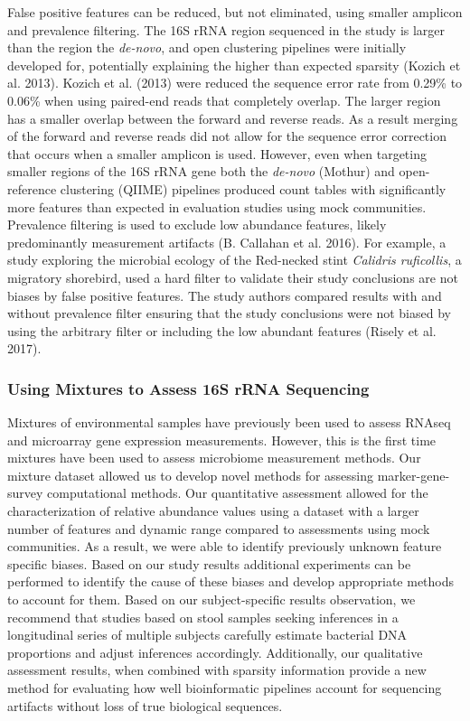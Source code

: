 \documentclass[smallextended]{svjour3}       %
\begin{document}
False positive features can be reduced, but not eliminated, using
smaller amplicon and prevalence filtering. The 16S rRNA region sequenced
in the study is larger than the region the \emph{de-novo}, and open
clustering pipelines were initially developed for, potentially
explaining the higher than expected sparsity (Kozich et al. 2013).
Kozich et al. (2013) were reduced the sequence error rate from 0.29\% to
0.06\% when using paired-end reads that completely overlap. The larger
region has a smaller overlap between the forward and reverse reads. As a
result merging of the forward and reverse reads did not allow for the
sequence error correction that occurs when a smaller amplicon is used.
However, even when targeting smaller regions of the 16S rRNA gene both
the \emph{de-novo} (Mothur) and open-reference clustering (QIIME)
pipelines produced count tables with significantly more features than
expected in evaluation studies using mock communities. Prevalence
filtering is used to exclude low abundance features, likely
predominantly measurement artifacts (B. Callahan et al. 2016). For
example, a study exploring the microbial ecology of the Red-necked stint
\emph{Calidris ruficollis}, a migratory shorebird, used a hard filter to
validate their study conclusions are not biases by false positive
features. The study authors compared results with and without prevalence
filter ensuring that the study conclusions were not biased by using the
arbitrary filter or including the low abundant features (Risely et al.
2017).

\hypertarget{using-mixtures-to-assess-16s-rrna-sequencing}{%
\subsubsection{Using Mixtures to Assess 16S rRNA
Sequencing}\label{using-mixtures-to-assess-16s-rrna-sequencing}}

Mixtures of environmental samples have previously been used to assess
RNAseq and microarray gene expression measurements. However, this is the
first time mixtures have been used to assess microbiome measurement
methods. Our mixture dataset allowed us to develop novel methods for
assessing marker-gene-survey computational methods. Our quantitative
assessment allowed for the characterization of relative abundance values
using a dataset with a larger number of features and dynamic range
compared to assessments using mock communities. As a result, we were
able to identify previously unknown feature specific biases. Based on
our study results additional experiments can be performed to identify
the cause of these biases and develop appropriate methods to account for
them. Based on our subject-specific results observation, we recommend
that studies based on stool samples seeking inferences in a longitudinal
series of multiple subjects carefully estimate bacterial DNA proportions
and adjust inferences accordingly. Additionally, our qualitative
assessment results, when combined with sparsity information provide a
new method for evaluating how well bioinformatic pipelines account for
sequencing artifacts without loss of true biological sequences.
\end{document}
